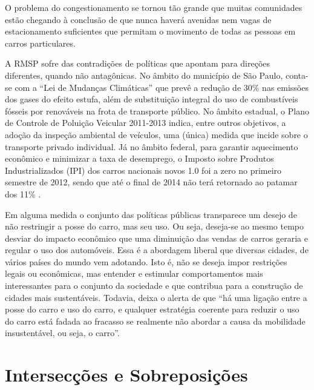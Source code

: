\begin{citacao}
O problema do congestionamento se tornou tão grande que muitas comunidades estão chegando à conclusão de que nunca haverá avenidas nem vagas de estacionamento suficientes que permitam o movimento de todas as pessoas em carros particulares.
\end{citacao}

A RMSP sofre das contradições de políticas que apontam para direções diferentes, quando não antagônicas. No âmbito do município de São Paulo, conta-se com a ``Lei de Mudanças Climáticas'' \cite{LEICLIMASP2009} que prevê a redução de 30\% nas emissões dos gases do efeito estufa, além de substituição integral do uso de combustíveis fósseis por renováveis na frota de transporte público. No âmbito estadual, o Plano de Controle de Poluição Veicular 2011-2013 \cite{PCPV2011} indica, entre outros objetivos, a adoção da inspeção ambiental de veículos, uma (única) medida que incide sobre o transporte privado individual. Já no âmbito federal, para garantir aquecimento econômico e minimizar a taxa de desemprego, o Imposto sobre Produtos Industrializados (IPI) dos carros nacionais novos 1.0 foi a zero no primeiro semestre de 2012, sendo que até o final de 2014 não terá retornado ao patamar dos 11\% \cite{FAZENDA2014}.

Em alguma medida o conjunto das políticas públicas transparece um desejo de não restringir a posse do carro, mas seu uso. Ou seja, deseja-se ao mesmo tempo desviar do impacto econômico que uma diminuição das vendas de carros geraria e regular o uso dos automóveis. Essa é a abordagem liberal que diversas cidades, de vários países do mundo vem adotando. Isto é, não se deseja impor restrições legais ou econômicas, mas entender e estimular comportamentos mais interessantes para o conjunto da sociedade e que contribua para a construção de cidades mais sustentáveis. Todavia,  deixa o alerta de que ``há uma ligação entre a posse do carro e uso do carro, e qualquer estratégia coerente para reduzir o uso do carro está fadada ao fracasso se realmente não abordar a causa da mobilidade insustentável, ou seja, o carro''.



\clearpage
\section{Intersecções e Sobreposições}

